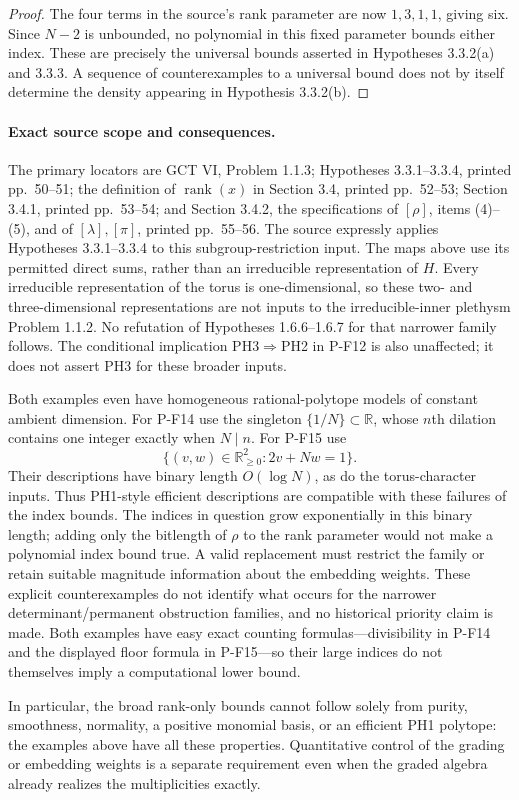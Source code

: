 \begin{proof}
The four terms in the source's rank parameter are now $1,3,1,1$,
giving six. Since $N-2$ is unbounded, no polynomial in this fixed
parameter bounds either index. These are precisely the universal
bounds asserted in Hypotheses 3.3.2(a) and 3.3.3. A sequence of
counterexamples to a universal bound does not by itself determine
the density appearing in Hypothesis 3.3.2(b).
\end{proof}

\paragraph{Exact source scope and consequences.}
The primary locators are GCT VI, Problem 1.1.3; Hypotheses 3.3.1--3.3.4,
printed pp.~50--51; the definition of $\operatorname{rank}(x)$ in
Section 3.4, printed pp.~52--53; Section 3.4.1, printed pp.~53--54;
and Section 3.4.2, the specifications of $[\rho]$, items (4)--(5),
and of $[\lambda],[\pi]$, printed pp.~55--56.
The source expressly applies Hypotheses 3.3.1--3.3.4 to this
subgroup-restriction input. The maps above use its permitted
direct sums, rather than an irreducible representation of $H$.
Every irreducible representation of the torus is one-dimensional,
so these two- and three-dimensional representations are not inputs
to the irreducible-inner plethysm Problem 1.1.2. No refutation of
Hypotheses 1.6.6--1.6.7 for that narrower family follows.
The conditional implication PH3$\Rightarrow$PH2 in P-F12 is also
unaffected; it does not assert PH3 for these broader inputs.

Both examples even have homogeneous rational-polytope models of
constant ambient dimension. For P-F14 use the singleton
$\{1/N\}\subset\mathbb R$, whose $n$th dilation contains one
integer exactly when $N\mid n$. For P-F15 use
\[
 \{(v,w)\in\mathbb R_{\ge0}^2:2v+Nw=1\}.
\]
Their descriptions have binary length $O(\log N)$, as do the
torus-character inputs. Thus PH1-style efficient descriptions are
compatible with these failures of the index bounds. The indices
in question grow exponentially in this binary length; adding only
the bitlength of $\rho$ to the rank parameter would not make a
polynomial index bound true. A valid replacement must restrict
the family or retain suitable magnitude information about the
embedding weights. These explicit counterexamples do not identify
what occurs for the narrower determinant/permanent obstruction
families, and no historical priority claim is made.
Both examples have easy exact counting formulas---divisibility in
P-F14 and the displayed floor formula in P-F15---so their large
indices do not themselves imply a computational lower bound.

In particular, the broad rank-only bounds cannot follow solely from
purity, smoothness, normality, a positive monomial basis, or an
efficient PH1 polytope: the examples above have all these properties.
Quantitative control of the grading or embedding weights is a
separate requirement even when the graded algebra already realizes
the multiplicities exactly.
